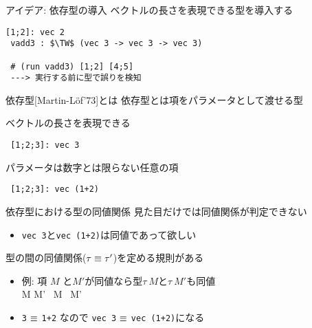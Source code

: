 \documentclass[dvipdfmx,aspectratio=169, 20pt]{beamer}
\renewcommand{\V}{\vdash}
\begin{document}
\begin{frame}[fragile]{アイデア: 依存型の導入}
    \renewcommand{\V}{\text{vec}\ }
    ベクトルの長さを表現できる型を導入する
    \begin{exampleblock}{}
        \begin{Verbatim}[commandchars=\\\{\},codes={\catcode`$=3\catcode`^=7}]
 [1;2]: vec 2
 vadd3 : $\TW$ (vec 3 -> vec 3 -> vec 3)

 # (run vadd3) [1;2] [4;5]
 ---> 実行する前に型で誤りを検知
 \end{Verbatim}
    \end{exampleblock}
\end{frame}

\begin{frame}[fragile]{依存型[Martin-L{\"o}f'73]とは}
    \renewcommand{\V}{\text{vec}\ }
    依存型とは項をパラメータとして渡せる型
    \begin{exampleblock}{ベクトルの長さを表現できる}
        \begin{Verbatim}
 [1;2;3]: vec 3
        \end{Verbatim}
    \end{exampleblock}
    \begin{exampleblock}{パラメータは数字とは限らない任意の項}
        \begin{Verbatim}
 [1;2;3]: vec (1+2) 
        \end{Verbatim}
    \end{exampleblock}
\end{frame}

\begin{frame}[fragile]{依存型における型の同値関係}
    見た目だけでは同値関係が判定できない
    \begin{itemize}
        \item \verb|vec 3|と\verb|vec (1+2)|は同値であって欲しい
    \end{itemize}
    型の間の同値関係(\( \tau \equiv \tau'\))を定める規則がある\\
    \begin{itemize}
    \item 例: 項 \(M \) と\(M'\)が同値なら型\( \tau\ M \)と\( \tau\ M'\)も同値 \\[2mm]
    \hspace{15mm} {\small \infrule
    { M \E M' }
    { \tau\ M \E \tau\ M'}}
\item \verb|3| \( \equiv \) \verb|1+2| なので \verb|vec 3| \( \equiv \) \verb|vec (1+2)|になる
    \end{itemize}
\end{frame}
\end{document}

